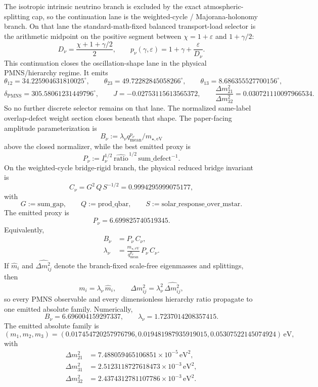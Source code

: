 The isotropic intrinsic neutrino branch is excluded by the exact atmospheric-splitting cap, so the continuation lane is the weighted-cycle / Majorana-holonomy branch. On that lane the standard-math-fixed balanced transport-load selector is the arithmetic midpoint on the positive segment between \(\chi=1+\varepsilon\) and \(1+\gamma/2\):
\[
D_\nu=\frac{\chi+1+\gamma/2}{2},
\qquad
p_\nu(\gamma,\varepsilon)=1+\gamma+\frac{\varepsilon}{D_\nu}.
\]
This continuation closes the oscillation-shape lane in the physical PMNS/hierarchy regime. It emits
\[
\theta_{12}=34.225904631810025^\circ,\qquad
\theta_{23}=49.72282845058266^\circ,\qquad
\theta_{13}=8.686355527700156^\circ,
\]
\[
\delta_{\mathrm{PMNS}}=305.58061231449796^\circ,\qquad
J=-0.02753115613565372,\qquad
\frac{\Delta m_{21}^2}{\Delta m_{32}^2}=0.030721110097966534.
\]
So no further discrete selector remains on that lane. The normalized same-label overlap-defect weight section closes beneath that shape. The paper-facing amplitude parameterization is
\[
B_\nu:=\lambda_\nu q_{\mathrm{mean}}^{p_\nu}/m_{\star,\mathrm{eV}}
\]
above the closed normalizer, while the best emitted proxy is
\[
P_\nu:=I_\nu^{1/2}\,\widehat{\mathrm{ratio}}^{\,1/2}\,\mathrm{sum\_defect}^{-1}.
\]
On the weighted-cycle bridge-rigid branch, the physical reduced bridge invariant is
\[
C_\nu=G^2\,Q\,S^{-1/2}=0.9994295999075177,
\]
with
\[
G:=\mathrm{sum\_gap},\qquad
Q:=\mathrm{prod\_qbar},\qquad
S:=\mathrm{solar\_response\_over\_mstar}.
\]
The emitted proxy is
\[
P_\nu=6.699825740519345.
\]
Equivalently,
\[
\begin{aligned}
B_\nu&=P_\nu\,C_\nu,\\
\lambda_\nu&=\frac{m_{\star,\mathrm{eV}}}{q_{\mathrm{mean}}^{p_\nu}}\,P_\nu\,C_\nu.
\end{aligned}
\]
If \(\hat m_i\) and \(\widehat{\Delta m_{ij}^2}\) denote the branch-fixed scale-free eigenmasses and splittings, then
\[
m_i=\lambda_\nu\,\hat m_i,
\qquad
\Delta m_{ij}^2=\lambda_\nu^2\,\widehat{\Delta m_{ij}^2},
\]
so every PMNS observable and every dimensionless hierarchy ratio propagate to one emitted absolute family. Numerically,
\[
B_\nu=6.696004159297337,
\qquad
\lambda_\nu=1.7237014208357415.
\]
The emitted absolute family is
\[
(m_1,m_2,m_3)=(0.017454720257976796,0.019481987935919015,0.05307522145074924)\,\mathrm{eV},
\]
with
\[
\begin{aligned}
\Delta m_{21}^2&=7.488059465106851\times10^{-5}\,\mathrm{eV}^2,\\
\Delta m_{31}^2&=2.5123118727618473\times10^{-3}\,\mathrm{eV}^2,\\
\Delta m_{32}^2&=2.4374312781107786\times10^{-3}\,\mathrm{eV}^2.
\end{aligned}
\]

